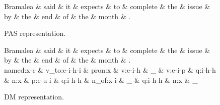 \begin{figure}
    \centering
    \smaller[]
    \begin{dependency}[]
        \begin{deptext}[column sep=0.5em, row sep=.1ex]
            Bramalea \& said \& it \& expects \& to \& complete \& the \& issue \& by \& the \& end \& of \& the \& month \& . \\
        \end{deptext}
    \end{dependency}
    \caption{PAS representation.}
    \label{PAS}
\end{figure}

\begin{figure}
    \centering
    \smaller[]
    \smaller[]
    \begin{dependency}[]
        \begin{deptext}[column sep=0.5em, row sep=.1ex]
            Bramalea \& said \& it \& expects \& to \& complete \& the \& issue \& by \& the \& end \& of \& the \& month \& . \\
            named:x-c \& v\_to:e-i-h-i \& pron:x \& v:e-i-h \& \_ \& v:e-i-p \& q:i-h-h \& n:x \& p:e-u-i \& q:i-h-h \& n\_of:x-i \& \_ \& q:i-h-h \& n:x \& \_ \\
        \end{deptext}
    \end{dependency}
    \caption{DM representation.}
    \label{DM}
\end{figure}

